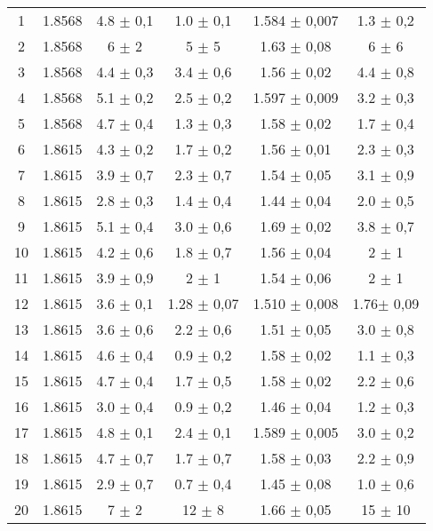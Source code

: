 \begin{landscape}
\begin{table}[h]
\begin{center}
\begin{tabular}{c S[table-format=1.4] S[table-format=1.1] S[table-format=1.2] S[table-format=1.3] S[table-format=1.2]}
 1  & 1.8568  & 4.8 $\pm$ 0,1  & 1.0  $\pm$ 0,1  & 1.584  $\pm$ 0,007 &  1.3 $\pm$   0,2\\
 2  & 1.8568  & 6   $\pm$ 2    & 5    $\pm$ 5    & 1.63   $\pm$ 0,08  &  6   $\pm$   6  \\
 3  & 1.8568  & 4.4 $\pm$ 0,3  & 3.4  $\pm$ 0,6  & 1.56   $\pm$ 0,02  &  4.4 $\pm$   0,8\\
 4  & 1.8568  & 5.1 $\pm$ 0,2  & 2.5  $\pm$ 0,2  & 1.597  $\pm$ 0,009 &  3.2 $\pm$   0,3\\
 5  & 1.8568  & 4.7 $\pm$ 0,4  & 1.3  $\pm$ 0,3  & 1.58   $\pm$ 0,02  &  1.7 $\pm$   0,4\\
 6  & 1.8615  & 4.3 $\pm$ 0,2  & 1.7  $\pm$ 0,2  & 1.56   $\pm$ 0,01  &  2.3 $\pm$   0,3\\
 7  & 1.8615  & 3.9 $\pm$ 0,7  & 2.3  $\pm$ 0,7  & 1.54   $\pm$ 0,05  &  3.1 $\pm$   0,9\\
 8  & 1.8615  & 2.8 $\pm$ 0,3  & 1.4  $\pm$ 0,4  & 1.44   $\pm$ 0,04  &  2.0 $\pm$   0,5\\
 9  & 1.8615  & 5.1 $\pm$ 0,4  & 3.0  $\pm$ 0,6  & 1.69   $\pm$ 0,02  &  3.8 $\pm$   0,7\\
10  & 1.8615  & 4.2 $\pm$ 0,6  & 1.8  $\pm$ 0,7  & 1.56   $\pm$ 0,04  &  2   $\pm$   1  \\
11  & 1.8615  & 3.9 $\pm$ 0,9  & 2    $\pm$ 1    & 1.54   $\pm$ 0,06  &  2   $\pm$   1   \\
12  & 1.8615  & 3.6 $\pm$ 0,1  & 1.28 $\pm$ 0,07 & 1.510  $\pm$ 0,008 &  1.76$\pm$   0,09\\
13  & 1.8615  & 3.6 $\pm$ 0,6  & 2.2  $\pm$ 0,6  & 1.51   $\pm$ 0,05  &  3.0 $\pm$   0,8\\
14  & 1.8615  & 4.6 $\pm$ 0,4  & 0.9  $\pm$ 0,2  & 1.58   $\pm$ 0,02  &  1.1 $\pm$   0,3\\
15  & 1.8615  & 4.7 $\pm$ 0,4  & 1.7  $\pm$ 0,5  & 1.58   $\pm$ 0,02  &  2.2 $\pm$   0,6\\
16  & 1.8615  & 3.0 $\pm$ 0,4  & 0.9  $\pm$ 0,2  & 1.46   $\pm$ 0,04  &  1.2 $\pm$   0,3\\
17  & 1.8615  & 4.8 $\pm$ 0,1  & 2.4  $\pm$ 0,1  & 1.589  $\pm$ 0,005 &  3.0 $\pm$   0,2 \\
18  & 1.8615  & 4.7 $\pm$ 0,7  & 1.7  $\pm$ 0,7  & 1.58   $\pm$ 0,03  &  2.2 $\pm$   0,9\\
19  & 1.8615  & 2.9 $\pm$ 0,7  & 0.7  $\pm$ 0,4  & 1.45   $\pm$ 0,08  &  1.0 $\pm$   0,6\\
20  & 1.8615  & 7   $\pm$ 2    & 12   $\pm$ 8    & 1.66   $\pm$ 0,05  & 15   $\pm$ 10\\

\end{tabular}
\end{center}
\end{table}
\end{landscape}
